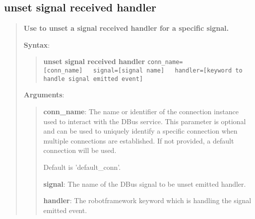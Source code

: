 \hypertarget{description-unset-signal-received-handler}{%
\subsection{\texorpdfstring{\textbf{unset signal received handler}}{unset signal received handler}}\label{description-unset-signal-received-handler}}

\begin{quote}
\textbf{Use to unset a signal received handler for a specific signal.}

\textbf{Syntax}:
\begin{quote}
\textbf{unset signal received handler}
\texttt{conn\_name={[}conn\_name{]}\ \ \ signal={[}signal name{]}\ \ \ handler={[}keyword to handle signal emitted event{]}}
\end{quote}

\textbf{Arguments}:

\begin{quote}
\textbf{conn\_name}: The name or identifier of the connection instance used to interact with the DBus service.
  This parameter is optional and can be used to uniquely identify a specific connection
  when multiple connections are established. If not provided, a default connection will be used.
  
  Default is 'default\_conn'.
  
\vspace{\baselineskip}

\textbf{signal}: The name of the DBus signal to be unset emitted handler.

\vspace{\baselineskip}

\textbf{handler}:  The robotframework keyword which is handling the signal emitted event.
\end{quote}
\end{quote}

